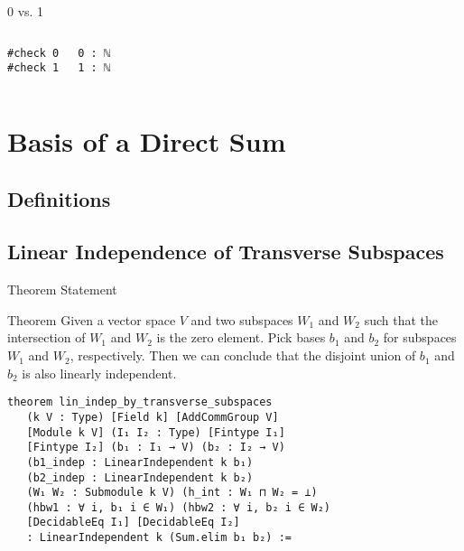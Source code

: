 \documentclass[svgnames]{beamer}
\begin{document}
\begin{frame}[label={sec:o},fragile]{0 vs. 1}

\begin{columns}
{
\begin{verbatim}
#check 0
#check 1
\end{verbatim}
}

{
\begin{verbatim}
0 : ℕ
1 : ℕ
\end{verbatim}
}

\end{columns}
\end{frame}







\section{Basis of a Direct Sum}
\subsection{Definitions}


\subsection{Linear Independence of Transverse Subspaces}

\begin{frame}[label={sec:o},fragile]{Theorem Statement}

\begin{block}{Theorem}
Given a vector space $V$ and two subspaces $W_1$ and $W_2$ such that the intersection of $W_1$ and $W_2$ is the zero element. Pick bases $b_1$ and $b_2$ for subspaces $W_1$ and $W_2$, respectively. Then we can conclude that the disjoint union of $b_1$ and $b_2$ is also linearly independent. 
\end{block}


{\scriptsize 
\begin{verbatim}
theorem lin_indep_by_transverse_subspaces
   (k V : Type) [Field k] [AddCommGroup V] 
   [Module k V] (I₁ I₂ : Type) [Fintype I₁] 
   [Fintype I₂] (b₁ : I₁ → V) (b₂ : I₂ → V)
   (b1_indep : LinearIndependent k b₁)
   (b2_indep : LinearIndependent k b₂)
   (W₁ W₂ : Submodule k V) (h_int : W₁ ⊓ W₂ = ⊥)
   (hbw1 : ∀ i, b₁ i ∈ W₁) (hbw2 : ∀ i, b₂ i ∈ W₂)
   [DecidableEq I₁] [DecidableEq I₂]
   : LinearIndependent k (Sum.elim b₁ b₂) :=
\end{verbatim}
}

\end{frame}
\end{document}
